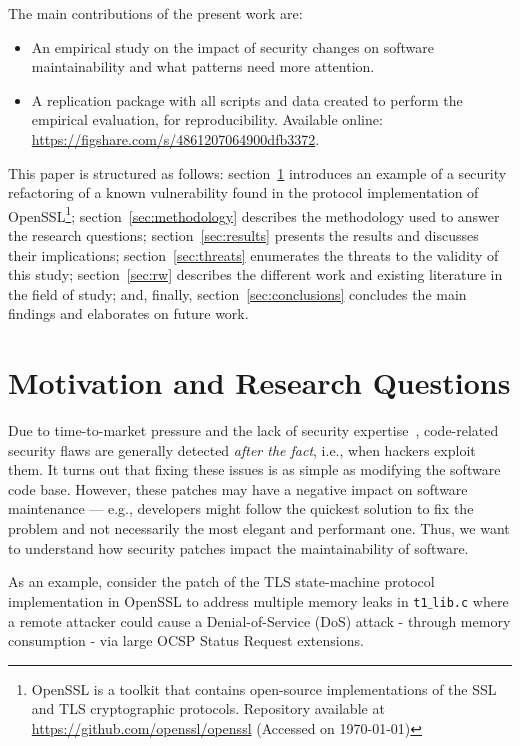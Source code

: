 \documentclass[10pt,conference]{IEEEtran}
\makeatletter
\newcommand\footnoteref[1]{\protected@xdef\@thefnmark{\ref{#1}}\@footnotemark}
\makeatother
\begin{document}
The main contributions of the present work are:
%
\begin{itemize}
	\item An empirical study on the impact of security changes on software
	maintainability and what patterns need more attention.
	\item A replication package with all scripts and data created to perform the
	empirical evaluation, for reproducibility. Available online:
  \url{https://figshare.com/s/4861207064900dfb3372}.
\end{itemize}
This paper is structured as follows: section~\ref{sec:motivation} introduces an
example of a security refactoring of a known vulnerability found in the
protocol implementation of OpenSSL\footnote{\label{openssl}OpenSSL is a toolkit that
contains open-source implementations of the SSL and TLS cryptographic
protocols. Repository available at \url{https://github.com/openssl/openssl}
(Accessed on \today{})}; section~\ref{sec:methodology} describes the
methodology used to answer the research questions; section~\ref{sec:results}
presents the results and discusses their
implications; section~\ref{sec:threats} enumerates the threats to the validity of
this study; section~\ref{sec:rw} describes the different work and existing
literature in the field of study; and, finally, section~\ref{sec:conclusions}
concludes the main findings and elaborates on future work.
%

\section{Motivation and Research Questions}\label{sec:motivation}
%
Due to time-to-market pressure and the lack of security expertise~\cite{8077802}, code-related
security flaws are generally detected \textit{after the fact}, i.e., when
hackers exploit them. It turns out that fixing these issues is as simple as
modifying the software code base. However, these patches may have a
negative impact on software maintenance --- e.g., developers might follow the
quickest solution to fix the problem and not necessarily the most elegant and
performant one. Thus, we want to understand how security patches impact
the maintainability of software. 

As an example, consider the patch of the TLS state-machine protocol implementation in 
OpenSSL\footnoteref{openssl} to address multiple memory leaks in \texttt{t1$\_$lib.c} 
where a remote attacker could cause a Denial-of-Service
(DoS) attack - through memory consumption - via large OCSP Status Request extensions.
\end{document}
